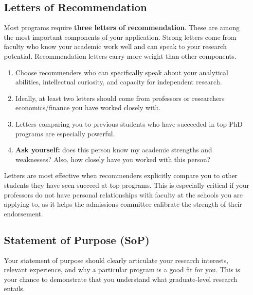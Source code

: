 \documentclass[11pt, letterpaper]{article}
\begin{document}
\subsection{Letters of Recommendation}

Most programs require \textbf{three letters of recommendation}. These are among the most important components of your application. Strong letters come from faculty who know your academic work well and can speak to your research potential. Recommendation letters carry more weight than other components. 

\begin{enumerate}[leftmargin=*, itemsep=2pt]
    \item Choose recommenders who can specifically speak about your analytical abilities, intellectual curiosity, and capacity for independent research.
    \item Ideally, at least two letters should come from professors or researchers {economics/finance} you have worked closely with.
    \item Letters comparing you to previous students who have succeeded in top PhD programs are especially powerful.
    \item \textbf{Ask yourself: }does this person know my academic strengths and weaknesses? Also, how closely have you worked with this person?
\end{enumerate}

\begin{tipbox}
Letters are most effective when recommenders explicitly compare you to other students they have seen succeed at top programs. This is especially critical if your professors do not have personal relationships with faculty at the schools you are applying to, as it helps the admissions committee calibrate the strength of their endorsement.
\end{tipbox}


\subsection{Statement of Purpose (SoP)}

Your statement of purpose should clearly articulate your research interests, relevant experience, and why a particular program is a good fit for you. This is your chance to demonstrate that you understand what graduate-level research entails.
\end{document}
